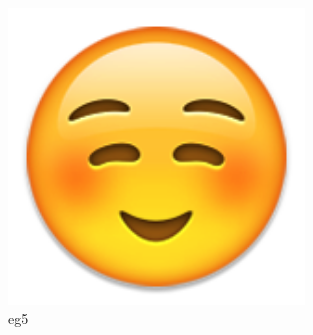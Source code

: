 \begin{solution}
\begin{enumerate}[nosep,label=(\arabic*)]
\begin{itemize}
\begin{latexamplev}[]
\begin{figure}[H]
\begin{minipage}[b]{0.3\textwidth}
	\includegraphics[width=0.7\textwidth]{./pic/05.png}
	\caption{eg5}
  \end{minipage}
 \end{figure}
\end{latexamplev}


\end{itemize}
\end{enumerate}
\end{solution}
